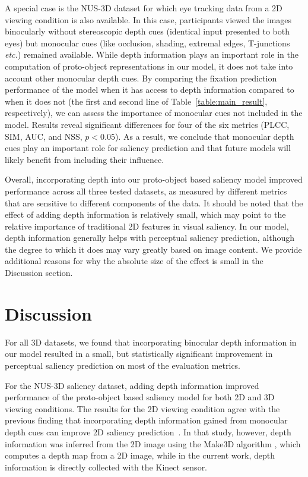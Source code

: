 \documentclass[12pt]{article}
\newcommand{\etc}[0]{{\em etc.}\xspace}
\begin{document}
A special case is the NUS-3D dataset for which eye tracking data from a 2D
viewing condition is also available. In this case, participants viewed
the images binocularly without stereoscopic depth cues (identical
input presented to both eyes) but monocular cues (like occlusion,
shading, extremal edges, T-junctions \etc) remained available. While depth
information plays an important role in the computation of proto-object
representations in our model, it does not take into account other monocular
depth cues. By comparing the fixation prediction performance of the
model when it has access to depth information compared to when it does
not (the first and second line of Table~\ref{table:main_result},
respectively), we can assess the importance of monocular cues not
included in the model. Results reveal significant differences for four
of the six metrics (PLCC, SIM, AUC, and NSS, $p < 0.05$). As a result, we conclude
that monocular depth cues play an important role for saliency prediction
and that future models will likely benefit from including their
influence.

Overall, incorporating depth into our proto-object based saliency
model improved performance across all three tested datasets, as measured by different metrics that are sensitive to different components of the data.
It should be noted that the effect of adding depth
information is relatively small, which may point to the relative
importance of traditional 2D features in visual saliency. In our
model, depth information generally helps with perceptual saliency
prediction, although the degree to which it does may vary greatly
based on image content. We provide additional reasons for why the
absolute size of the effect is small in the Discussion section. 

\section{Discussion}

For all 3D datasets, we found that incorporating binocular
depth information in our model resulted in a small, but statistically
significant improvement in perceptual saliency prediction on most of
the evaluation metrics.

For the NUS-3D saliency dataset, adding depth information improved
performance of the proto-object based saliency model for both 2D and
3D viewing conditions.  
The results for the 2D viewing condition 
agree with the previous finding
that incorporating depth information gained from monocular depth cues
can improve 2D saliency prediction~\citep{Ramenahalli_etal13}.  In
that study, however, depth information was inferred from the 2D image
using the Make3D algorithm \citep{Saxena_etal09}, which computes a
depth map from a 2D image, while in the current work, depth
information is directly collected with the
Kinect sensor.
\end{document}
